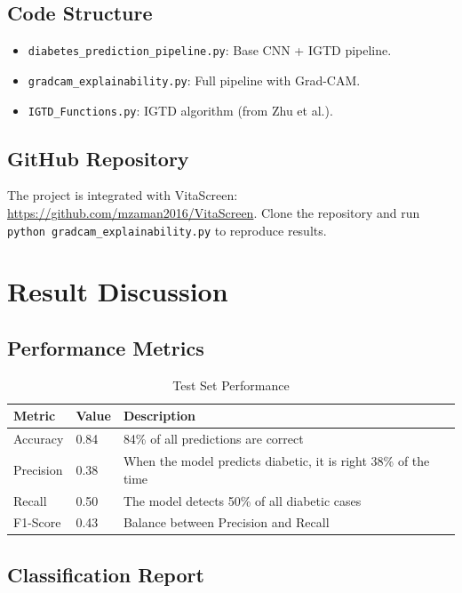 \documentclass[12pt]{dalthesis}
\begin{document}
\section{Code Structure}

\begin{itemize}
\item \texttt{diabetes\_prediction\_pipeline.py}: Base CNN + IGTD pipeline.
\item \texttt{gradcam\_explainability.py}: Full pipeline with Grad-CAM.
\item \texttt{IGTD\_Functions.py}: IGTD algorithm (from Zhu et al.).
\end{itemize}

\section{GitHub Repository}

The project is integrated with VitaScreen: \url{https://github.com/mzaman2016/VitaScreen}. Clone the repository and run \texttt{python gradcam\_explainability.py} to reproduce results.

\chapter{Result Discussion}\label{ch:results}

\section{Performance Metrics}

\begin{table}[H]
\centering
\caption{Test Set Performance}
\begin{tabular}{@{}lll@{}}
\toprule
\textbf{Metric} & \textbf{Value} & \textbf{Description} \\
\midrule
Accuracy  & 0.84 & 84\% of all predictions are correct \\
Precision & 0.38 & When the model predicts diabetic, it is right 38\% of the time \\
Recall    & 0.50 & The model detects 50\% of all diabetic cases \\
F1-Score  & 0.43 & Balance between Precision and Recall \\
\bottomrule
\end{tabular}
\end{table}

\section{Classification Report}
\end{document}
